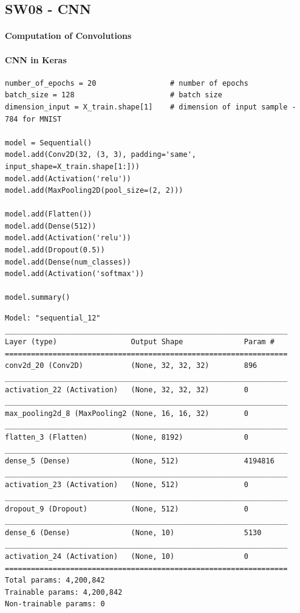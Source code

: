 \documentclass[11pt]{article}
\begin{document}
\subsection{SW08 - CNN}
\paragraph{Computation of Convolutions}


\paragraph{CNN in Keras}
\begin{verbatim}
number_of_epochs = 20                 # number of epochs
batch_size = 128                      # batch size
dimension_input = X_train.shape[1]    # dimension of input sample - 784 for MNIST

model = Sequential()
model.add(Conv2D(32, (3, 3), padding='same',
input_shape=X_train.shape[1:]))
model.add(Activation('relu'))
model.add(MaxPooling2D(pool_size=(2, 2)))

model.add(Flatten())
model.add(Dense(512))
model.add(Activation('relu'))
model.add(Dropout(0.5))
model.add(Dense(num_classes))
model.add(Activation('softmax'))

model.summary()
\end{verbatim}
\begin{small}
\begin{verbatim}
Model: "sequential_12"
_________________________________________________________________
Layer (type)                 Output Shape              Param #   
=================================================================
conv2d_20 (Conv2D)           (None, 32, 32, 32)        896       
_________________________________________________________________
activation_22 (Activation)   (None, 32, 32, 32)        0         
_________________________________________________________________
max_pooling2d_8 (MaxPooling2 (None, 16, 16, 32)        0         
_________________________________________________________________
flatten_3 (Flatten)          (None, 8192)              0         
_________________________________________________________________
dense_5 (Dense)              (None, 512)               4194816   
_________________________________________________________________
activation_23 (Activation)   (None, 512)               0         
_________________________________________________________________
dropout_9 (Dropout)          (None, 512)               0         
_________________________________________________________________
dense_6 (Dense)              (None, 10)                5130      
_________________________________________________________________
activation_24 (Activation)   (None, 10)                0         
=================================================================
Total params: 4,200,842
Trainable params: 4,200,842
Non-trainable params: 0
\end{verbatim}
\end{small}
\end{document}

